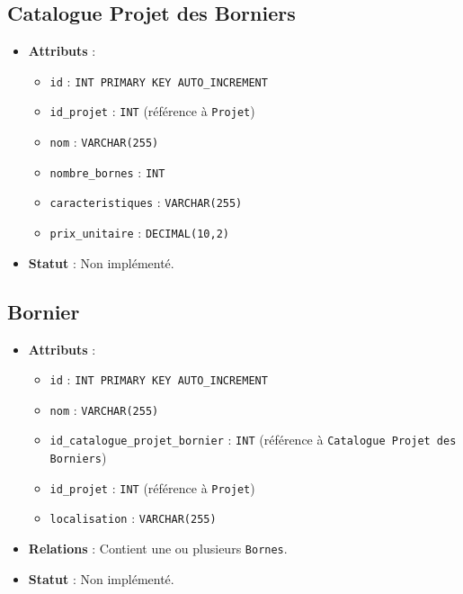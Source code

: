 \documentclass[a4paper,12pt]{article}
\begin{document}
\subsection{Catalogue Projet des Borniers}
\begin{itemize}
    \item \textbf{Attributs} :
    \begin{itemize}
        \item \texttt{id} : \texttt{INT PRIMARY KEY AUTO\_INCREMENT}
        \item \texttt{id\_projet} : \texttt{INT} (référence à \texttt{Projet})
        \item \texttt{nom} : \texttt{VARCHAR(255)}
        \item \texttt{nombre\_bornes} : \texttt{INT}
        \item \texttt{caracteristiques} : \texttt{VARCHAR(255)}
        \item \texttt{prix\_unitaire} : \texttt{DECIMAL(10,2)}
    \end{itemize}
    \item \textbf{Statut} : Non implémenté.
\end{itemize}

\subsection{Bornier}
\begin{itemize}
    \item \textbf{Attributs} :
    \begin{itemize}
        \item \texttt{id} : \texttt{INT PRIMARY KEY AUTO\_INCREMENT}
        \item \texttt{nom} : \texttt{VARCHAR(255)}
        \item \texttt{id\_catalogue\_projet\_bornier} : \texttt{INT} (référence à \texttt{Catalogue Projet des Borniers})
        \item \texttt{id\_projet} : \texttt{INT} (référence à \texttt{Projet})
        \item \texttt{localisation} : \texttt{VARCHAR(255)}
    \end{itemize}
    \item \textbf{Relations} : Contient une ou plusieurs \texttt{Bornes}.
    \item \textbf{Statut} : Non implémenté.
\end{itemize}
\end{document}
